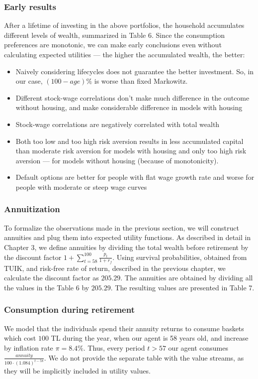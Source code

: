 \documentclass[]{article}
\begin{document}
\subsubsection{Early results}

After a lifetime of investing in the above portfolios, the household accumulates different levels of wealth, summarized in Table 6. Since the consumption preferences are monotonic, we can make early conclusions even without calculating expected utilities --- the higher the accumulated wealth, the better: 

\begin{itemize}
\item Naively considering lifecycles does not guarantee the better investment. So, in our case, $(100-age)\%$ is worse than fixed Markowitz.
\item Different stock-wage correlations don't make much difference in the outcome without housing, and make considerable difference in models with housing
\item Stock-wage correlations are negatively correlated with total wealth
\item Both too low and too high risk aversion results in less accumulated capital than moderate risk aversion for models with housing and only too high risk aversion --- for models without housing (because of monotonicity).\\
\item Default options are better for people with flat wage growth rate and worse for people with moderate or steep wage curves
\end{itemize}

\subsubsection{Annuitization}
To formalize the observations made in the previous section, we will construct annuities and plug them into expected utility functions. As described in detail in Chapter 3, we define annuities by dividing the total wealth before retirement by the discount factor $1 + \sum^{100}_{t=58}\frac{p_t}{1+r_f}$. Using survival probabilities, obtained from TUIK, and risk-free rate of return, described in the previous chapter, we calculate the discount factor as $205.29$. The annuities are obtained by dividing all the values in the Table 6 by $205.29$. The resulting values are presented in Table 7. 


\subsubsection{Consumption during retirement}
We model that the individuals spend their annuity returns to consume baskets which cost $100$ TL during the year, when our agent is 58 years old, and increase by inflation rate $\pi = 8.4\%$. Thus, every period $t>57$ our agent consumes $\frac{annuity}{100\cdot\left(1.084\right)^{t-58}}$. We do not provide the separate table with the value streams, as they will be implicitly included in utility values.
\end{document}
